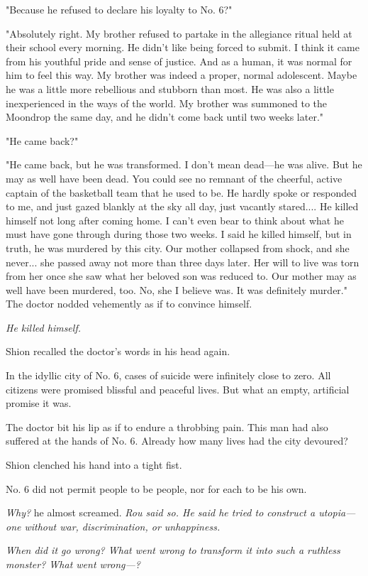 "Because he refused to declare his loyalty to No. 6?"

"Absolutely right. My brother refused to partake in the allegiance
ritual held at their school every morning. He didn't like being forced
to submit. I think it came from his youthful pride and sense of justice.
And as a human, it was normal for him to feel this way. My brother was
indeed a proper, normal adolescent. Maybe he was a little more
rebellious and stubborn than most. He was also a little inexperienced in
the ways of the world. My brother was summoned to the Moondrop the same
day, and he didn't come back until two weeks later."

"He came back?"

"He came back, but he was transformed. I don't mean dead---he was alive.
But he may as well have been dead. You could see no remnant of the
cheerful, active captain of the basketball team that he used to be. He
hardly spoke or responded to me, and just gazed blankly at the sky all
day, just vacantly stared.... He killed himself not long after coming
home. I can't even bear to think about what he must have gone through
during those two weeks. I said he killed himself, but in truth, he was
murdered by this city. Our mother collapsed from shock, and she never...
she passed away not more than three days later. Her will to live was
torn from her once she saw what her beloved son was reduced to. Our
mother may as well have been murdered, too. No, she I believe was. It
was definitely murder." The doctor nodded vehemently as if to convince
himself.

\emph{He killed himself.}

Shion recalled the doctor's words in his head again.

In the idyllic city of No. 6, cases of suicide were infinitely close to
zero. All citizens were promised blissful and peaceful lives. But what
an empty, artificial promise it was.

The doctor bit his lip as if to endure a throbbing pain. This man had
also suffered at the hands of No. 6. Already how many lives had the city
devoured?

Shion clenched his hand into a tight fist.

No. 6 did not permit people to be people, nor for each to be his own.

\emph{Why?} he almost screamed. \emph{Rou said so. He said he tried to construct a
utopia---one without war, discrimination, or unhappiness.}

\emph{When did it go wrong? What went wrong to transform it into such a
ruthless monster? What went wrong---?}

